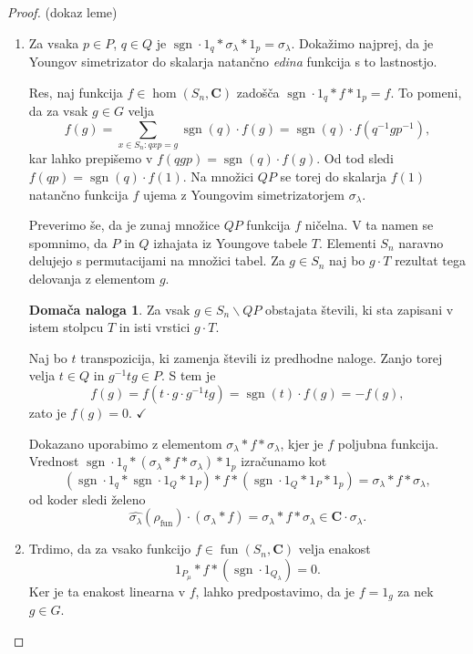 \documentclass[11pt]{book}
\def\CC{\mathbf{C}}
\def\youngsym{\sigma_{\lambda}}
\DeclareMathOperator\sgn{sgn}
\DeclareMathOperator\fun{fun}
\def\kljuka{$\checkmark$}
\theoremstyle{definition}
\theoremstyle{zgled}
\theoremstyle{zgledbrezstevilke}
\theoremstyle{odprtproblem}
\theoremstyle{domacanaloga}
\newtheorem{domacanaloga}[theorem]{Domača naloga}
\newenvironment{dokaz}
    {\color{siva}\begin{proof}}
    {\end{proof}}
\theoremstyle{izrek}
\begin{document}
\begin{dokaz}(dokaz leme) \leavevmode
\begin{enumerate}
    \item Za vsaka $p \in P$, $q \in Q$ je $\sgn \cdot 1_q * \youngsym * 1_p = \youngsym$. Dokažimo najprej, da je Youngov simetrizator do skalarja natančno \emph{edina} funkcija s to lastnostjo. 
    
    Res, naj funkcija $f \in \hom(S_n, \CC)$ zadošča $\sgn \cdot 1_q * f * 1_p = f$. To pomeni, da za vsak $g \in G$ velja
    \[
        f(g) = \sum_{x \in S_n \colon q x p = g} \sgn(q) \cdot f(g) = \sgn(q) \cdot f(q^{-1} g p^{-1}),
    \]
    kar lahko prepišemo v $f(qgp) = \sgn(q) \cdot f(g)$. Od tod sledi $f(qp) = \sgn(q) \cdot f(1)$. Na množici $QP$ se torej do skalarja $f(1)$ natančno funkcija $f$ ujema z Youngovim simetrizatorjem $\youngsym$. 
    
    Preverimo še, da je zunaj množice $QP$ funkcija $f$ ničelna. V ta namen se spomnimo, da $P$ in $Q$ izhajata iz Youngove tabele $T$. Elementi $S_n$ naravno delujejo s permutacijami na množici tabel. Za $g \in S_n$ naj bo $g \cdot T$ rezultat tega delovanja z elementom $g$.

    \begin{domacanaloga}
    Za vsak $g \in S_n \backslash QP$ obstajata števili, ki sta zapisani v istem stolpcu $T$ in isti vrstici $g \cdot T$.
    \end{domacanaloga}

    Naj bo $t$ transpozicija, ki zamenja števili iz predhodne naloge. Zanjo torej velja $t \in Q$ in $g^{-1} t g \in P$. S tem je
    \[
        f(g) = f(t \cdot g \cdot g^{-1} t g) = \sgn(t) \cdot f(g) = - f(g),
    \]
    zato je $f(g) = 0$. \kljuka

    Dokazano uporabimo z elementom $\youngsym * f * \youngsym$, kjer je $f$ poljubna funkcija. Vrednost $\sgn \cdot 1_q * (\youngsym * f * \youngsym) * 1_p$ izračunamo kot
    \[
        (\sgn \cdot 1_q * \sgn \cdot 1_Q * 1_P) * f * (\sgn \cdot 1_Q * 1_P * 1_p) =
        \youngsym * f * \youngsym,
    \]
    od koder sledi želeno
    \[
        \widehat{\youngsym}(\rho_{\fun}) \cdot (\youngsym * f) = \youngsym * f * \youngsym \in \CC \cdot \youngsym.
    \]

    \item Trdimo, da za vsako funkcijo $f \in \fun(S_n, \CC)$ velja enakost
    \[    
        1_{P_\mu} * f * (\sgn \cdot 1_{Q_{\lambda}}) = 0.
    \]
    Ker je ta enakost linearna v $f$, lahko predpostavimo, da je $f = 1_g$ za nek $g \in G$.
    

\end{enumerate}
\end{dokaz}
\end{document}
